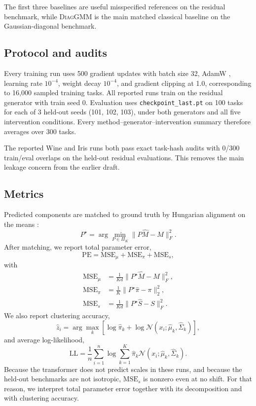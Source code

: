 \documentclass{article}
\newcommand{\diaggmm}{\textsc{DiagGMM}}
\newcommand{\PE}{\mathrm{PE}}
\newcommand{\LL}{\mathrm{LL}}
\begin{document}
The first three baselines are useful misspecified references on the residual benchmark, while \diaggmm{} is the main matched classical baseline on the Gaussian-diagonal benchmark.

\subsection{Protocol and audits}
Every training run uses 500 gradient updates with batch size 32, AdamW \citep{loshchilov2019decoupled}, learning rate $10^{-4}$, weight decay $10^{-4}$, and gradient clipping at 1.0, corresponding to 16{,}000 sampled training tasks. All reported runs train on the residual generator with train seed 0. Evaluation uses \texttt{checkpoint\_last.pt} on 100 tasks for each of 3 held-out seeds (101, 102, 103), under both generators and all five intervention conditions. Every method--generator--intervention summary therefore averages over 300 tasks.

The reported Wine and Iris runs both pass exact task-hash audits with 0/300 train/eval overlaps on the held-out residual evaluations. This removes the main leakage concern from the earlier draft.

\subsection{Metrics}
Predicted components are matched to ground truth by Hungarian alignment on the means \citep{kuhn1955hungarian}:
\begin{equation}
P^\star = \arg\min_{P \in \Pi_K} \lVert P\hat{M} - M \rVert_F^2.
\end{equation}
After matching, we report total parameter error,
\begin{equation}
\PE = \mathrm{MSE}_{\mu} + \mathrm{MSE}_{\pi} + \mathrm{MSE}_{s},
\end{equation}
with
\begin{align}
\mathrm{MSE}_{\mu} &= \frac{1}{Kd} \lVert P^\star \hat{M} - M \rVert_F^2, \\
\mathrm{MSE}_{\pi} &= \frac{1}{K} \lVert P^\star \hat{\pi} - \pi \rVert_2^2, \\
\mathrm{MSE}_{s} &= \frac{1}{Kd} \lVert P^\star \hat{S} - S \rVert_F^2.
\end{align}
We also report clustering accuracy,
\begin{equation}
\hat{z}_i = \arg\max_k \left[\log \hat{\pi}_k + \log \mathcal{N}(x_i;\hat{\mu}_k,\hat{\Sigma}_k)\right],
\end{equation}
and average log-likelihood,
\begin{equation}
\LL = \frac{1}{n} \sum_{i=1}^n \log \sum_{k=1}^K \hat{\pi}_k \mathcal{N}(x_i;\hat{\mu}_k,\hat{\Sigma}_k).
\end{equation}
Because the transformer does not predict scales in these runs, and because the held-out benchmarks are not isotropic, $\mathrm{MSE}_s$ is nonzero even at no shift. For that reason, we interpret total parameter error together with its decomposition and with clustering accuracy.
\end{document}
